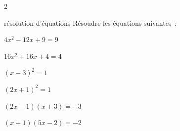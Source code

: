 \begin{multicols}{2}
\begin{exercice}{}{résolution d'équations}
    Résoudre les équations suivantes~:
    \begin{enumeratebf}
        \item $4x^2 - 12x + 9 = 9$
        \item $16x^2 + 16x + 4 = 4$
        \item $(x-3)^2 = 1$
        \item $(2x+1)^2 = 1$
        \item $(2x-1)(x+3) = -3$
        \item $(x+1)(5x-2) = -2$
    \end{enumeratebf}
\end{exercice}

\end{multicols}

